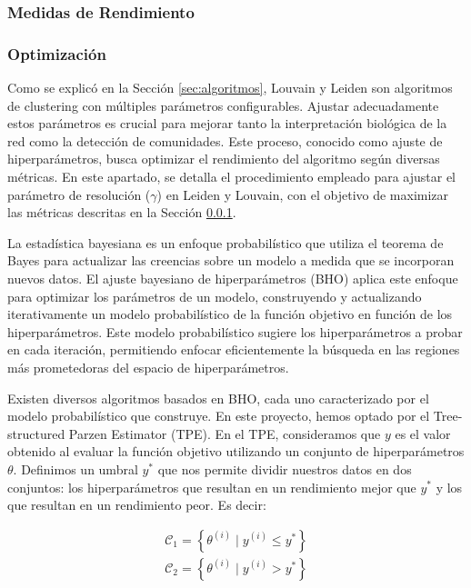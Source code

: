 \subsubsection{Medidas de Rendimiento}
\label{sec:metricas}

\subsubsection{Optimización}

Como se explicó en la Sección \ref{sec:algoritmos}, Louvain y Leiden son algoritmos de clustering con múltiples parámetros configurables. Ajustar adecuadamente estos parámetros es crucial para mejorar tanto la interpretación biológica de la red como la detección de comunidades. Este proceso, conocido como ajuste de hiperparámetros, busca optimizar el rendimiento del algoritmo según diversas métricas. En este apartado, se detalla el procedimiento empleado para ajustar el parámetro de resolución (\(\gamma\)) en Leiden y Louvain, con el objetivo de maximizar las métricas descritas en la Sección \ref{sec:metricas}.

La estadística bayesiana es un enfoque probabilístico que utiliza el teorema de Bayes para actualizar las creencias sobre un modelo a medida que se incorporan nuevos datos. El ajuste bayesiano de hiperparámetros (BHO) aplica este enfoque para optimizar los parámetros de un modelo, construyendo y actualizando iterativamente un modelo probabilístico de la función objetivo en función de los hiperparámetros. Este modelo probabilístico sugiere los hiperparámetros a probar en cada iteración, permitiendo enfocar eficientemente la búsqueda en las regiones más prometedoras del espacio de hiperparámetros.

Existen diversos algoritmos basados en BHO, cada uno caracterizado por el modelo probabilístico que construye. En este proyecto, hemos optado por el Tree-structured Parzen Estimator (TPE). En el TPE, consideramos que \( y \) es el valor obtenido al evaluar la función objetivo utilizando un conjunto de hiperparámetros \( \theta \). Definimos un umbral \( y^* \) que nos permite dividir nuestros datos en dos conjuntos: los hiperparámetros que resultan en un rendimiento mejor que \( y^* \) y los que resultan en un rendimiento peor. Es decir:

\begin{equation}
	\begin{aligned}
		\mathcal{C}_1 = \left\{ \theta^{(i)} \mid y^{(i)} \leq y^* \right\} \\
		\mathcal{C}_2 = \left\{ \theta^{(i)} \mid y^{(i)} > y^* \right\}
	\end{aligned}
\end{equation}

